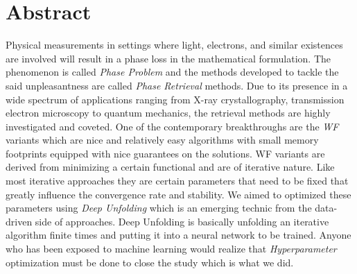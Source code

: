 \chapter*{Abstract}

Physical measurements in settings where light, electrons, and similar existences are involved will result in a phase loss in the
mathematical formulation. The phenomenon is called \emph{Phase Problem} and the methods developed to tackle the said unpleasantness
are called \emph{Phase Retrieval} methods. Due to its presence in a wide spectrum of applications ranging from X-ray crystallography, 
transmission electron microscopy to quantum mechanics, the retrieval methods are highly investigated and coveted. One of the contemporary 
breakthroughs are the \emph{\ac{WF}} variants which are nice and relatively easy algorithms with small memory footprints equipped with nice 
guarantees on the solutions. \ac{WF} variants are derived from minimizing a certain functional and are of iterative nature. Like most 
iterative approaches they are certain parameters that need to be fixed that greatly influence the convergence rate and stability. We aimed 
to optimized these parameters using \emph{Deep Unfolding} which is an emerging technic from the data-driven side of approaches. Deep Unfolding 
is basically unfolding an iterative algorithm finite times and putting it into a neural network to be trained. Anyone who has been exposed 
to machine learning would realize that \emph{Hyperparameter} optimization must be done to close the study which is what we did.       


\endinput